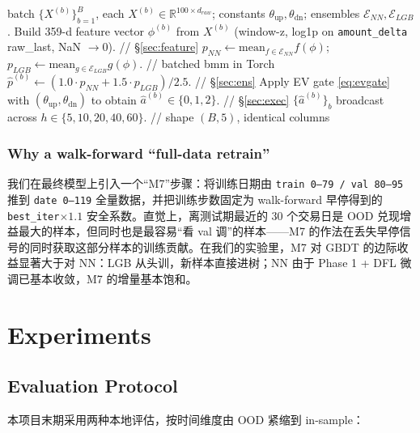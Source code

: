 \documentclass[11pt]{article}
\begin{document}
\begin{algorithm}[t]
\caption{Stateless inference (one call to \texttt{Predictor.predict}).}
\label{alg:predict}
\begin{algorithmic}[1]
\REQUIRE batch $\{X^{(b)}\}_{b=1}^B$, each $X^{(b)}\in\mathbb{R}^{100\times d_{raw}}$; constants $\theta_{\text{up}}, \theta_{\text{dn}}$; ensembles $\mathcal{E}_{NN}, \mathcal{E}_{LGB}$.
\STATE Build 359-d feature vector $\phi^{(b)}$ from $X^{(b)}$ (window-z, log1p on \texttt{amount\_delta} raw\_last, NaN $\to 0$). \hfill // \S\ref{sec:feature}
\STATE $p_{NN} \leftarrow \mathrm{mean}_{f\in\mathcal{E}_{NN}} f(\phi)$; \quad $p_{LGB} \leftarrow \mathrm{mean}_{g\in\mathcal{E}_{LGB}} g(\phi)$. \hfill // batched bmm in Torch
\STATE $\hat p^{(b)} \leftarrow (1.0\cdot p_{NN} + 1.5\cdot p_{LGB}) / 2.5$. \hfill // \S\ref{sec:ens}
\STATE Apply EV gate \eqref{eq:evgate} with $(\theta_{\text{up}}, \theta_{\text{dn}})$ to obtain $\hat a^{(b)}\in\{0,1,2\}$. \hfill // \S\ref{sec:exec}
\RETURN $\{\hat a^{(b)}\}_b$ broadcast across $h\in\{5,10,20,40,60\}$. \hfill // shape $(B, 5)$, identical columns
\end{algorithmic}
\end{algorithm}

\subsubsection*{Why a walk-forward ``full-data retrain''}
我们在最终模型上引入一个``M7''步骤：将训练日期由 \texttt{train 0--79 / val 80--95} 推到 \texttt{date 0--119} 全量数据，并把训练步数固定为 walk-forward 早停得到的 \texttt{best\_iter}$\times 1.1$ 安全系数。直觉上，离测试期最近的 30 个交易日是 OOD 兑现增益最大的样本，但同时也是最容易``看 val 调''的样本——M7 的作法在丢失早停信号的同时获取这部分样本的训练贡献。在我们的实验里，M7 对 GBDT 的边际收益显著大于对 NN：LGB 从头训，新样本直接进树；NN 由于 Phase 1 + DFL 微调已基本收敛，M7 的增量基本饱和。

\section{Experiments}
\label{sec:exp}

\subsection{Evaluation Protocol}
\label{sec:protocol}

本项目末期采用两种本地评估，按时间维度由 OOD 紧缩到 in-sample：
\end{document}
